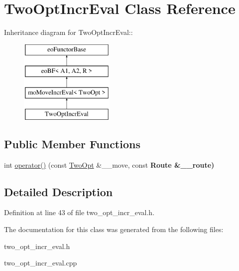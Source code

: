 \hypertarget{classTwoOptIncrEval}{
\section{Two\-Opt\-Incr\-Eval Class Reference}
\label{classTwoOptIncrEval}
}
Inheritance diagram for Two\-Opt\-Incr\-Eval::\begin{figure}[H]
\begin{center}
\leavevmode
\includegraphics[height=4cm]{classTwoOptIncrEval}
\end{center}
\end{figure}
\subsection*{Public Member Functions}
\begin{CompactItemize}
\item 
\hypertarget{classTwoOptIncrEval_48500077e651c4c6152daef8a396be39}{
int \hyperlink{classTwoOptIncrEval_48500077e651c4c6152daef8a396be39}{operator()} (const \hyperlink{classTwoOpt}{Two\-Opt} \&\_\-\_\-move, const \bf{Route} \&\_\-\_\-route)}
\label{classTwoOptIncrEval_48500077e651c4c6152daef8a396be39}

\end{CompactItemize}


\subsection{Detailed Description}




Definition at line 43 of file two\_\-opt\_\-incr\_\-eval.h.

The documentation for this class was generated from the following files:\begin{CompactItemize}
\item 
two\_\-opt\_\-incr\_\-eval.h\item 
two\_\-opt\_\-incr\_\-eval.cpp\end{CompactItemize}
